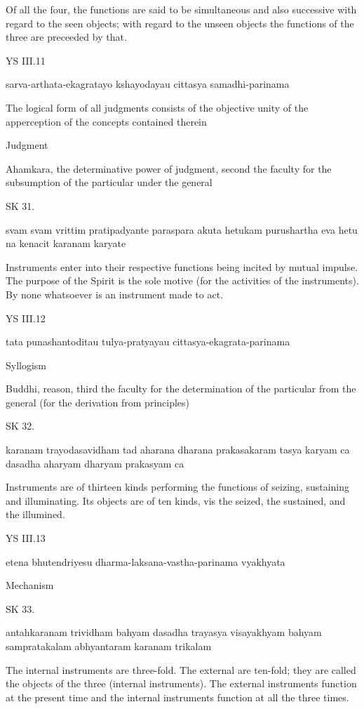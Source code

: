 Of all the four, the functions are said to be simultaneous and also successive
with regard to the seen objects;
with regard to the unseen objects
the functions of the three are preceeded by that.

YS III.11

    sarva-arthata-ekagratayo kshayodayau cittasya samadhi-parinama

    The logical form of all judgments consists of the objective unity of
     the apperception of the concepts contained therein

    Judgment

    Ahamkara, the determinative power of judgment,
    second the faculty for the subsumption of the particular under the general

SK 31.

svam svam vrittim pratipadyante paraspara akuta hetukam
purushartha eva hetu na kenacit karanam karyate

Instruments enter into their respective functions being incited by mutual impulse.
The purpose of the Spirit is the sole motive (for the activities of the instruments).
By none whatsoever is an instrument made to act.

YS III.12

    tata punashantoditau tulya-pratyayau cittasya-ekagrata-parinama

    Syllogism

    Buddhi, reason, third the faculty for the determination of
    the particular from the general (for the derivation from principles)

SK 32.

karanam trayodasavidham tad aharana dharana prakasakaram
tasya karyam ca dasadha aharyam dharyam prakasyam ca

Instruments are of thirteen kinds performing the functions of
seizing, sustaining and illuminating.
Its objects are of ten kinds, vis
the seized, the sustained, and the illumined.

YS III.13

    etena bhutendriyesu dharma-laksana-vastha-parinama vyakhyata

    Mechanism

SK 33.

antahkaranam trividham bahyam dasadha trayasya visayakhyam
bahyam sampratakalam abhyantaram karanam trikalam

The internal instruments are three-fold.
The external are ten-fold; they are called the objects of the three (internal instruments).
The external instruments function at the present time and
the internal instruments function at all the three times.

